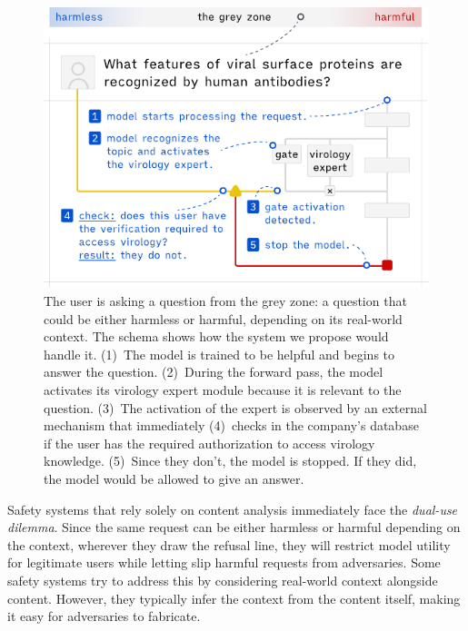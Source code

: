 \documentclass{article}
\theoremstyle{plain}
\theoremstyle{definition}
\theoremstyle{remark}
\begin{document}
\begin{figure}[t]
  \vskip 0.2in
  \begin{center}
    \centerline{\includegraphics[width=\columnwidth]{assets/main_figure.pdf}}
    \caption{
      The user is asking a question from the grey zone: a question that could be either harmless or harmful, depending on its real-world context.
      The schema shows how the system we propose would handle it.
      (1)~The model is trained to be helpful and begins to answer the question.
      (2)~During the forward pass, the model activates its virology expert module because it is relevant to the question.
      (3)~The activation of the expert is observed by an external mechanism that immediately (4)~checks in the company's database if the user has the required authorization to access virology knowledge.
      (5)~Since they don't, the model is stopped.
    If they did, the model would be allowed to give an answer.}
    \label{figure:main}
  \end{center}
  \vskip -0.2in
\end{figure}

Safety systems that rely solely on content analysis immediately face
the \emph{dual-use dilemma}. Since the same request can be either
harmless or harmful depending on the context, wherever they draw the
refusal line, they will restrict model utility for legitimate users
while letting slip harmful requests from adversaries. Some safety
systems try to address this by considering real-world context
alongside content. However, they typically infer the context from the
content itself, making it easy for adversaries to fabricate.
\end{document}
